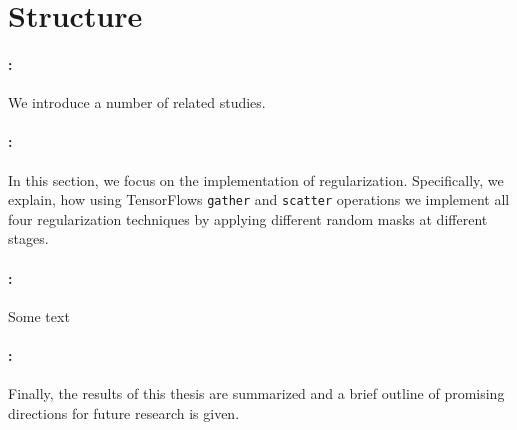 \section{Structure}%
\label{sec:intro:structure}

\paragraph{: }
We introduce a number of related studies.
\paragraph{: }
In this section, we focus on the implementation of regularization. Specifically, we explain, how using TensorFlows \texttt{gather} and \texttt{scatter} operations we implement all four regularization techniques by applying different random masks at different stages.
\paragraph{: }
Some text
\paragraph{: }
Finally, the results of this thesis are summarized and a brief outline of promising directions for future research is given.
